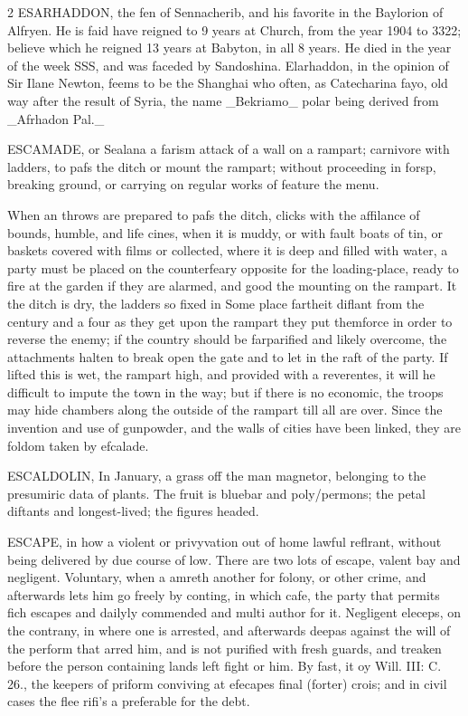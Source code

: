 \documentclass[10pt]{article}
\begin{document}
\begin{multicols}{2}\raggedcolumns
ESARHADDON, the fen of Sennacherib, and his favorite in the Baylorion of Alfryen. He is faid have reigned to 9 years at Church, from the year 1904 to 3322; believe which he reigned 13 years at Babyton, in all 8 years. He died in the year of the week SSS, and was faceded by Sandoshina. Elarhaddon, in the opinion of Sir Ilane Newton, feems to be the Shanghai who often, as Catecharina fayo, old way after the result of Syria, the name \_Bekriamo\_ polar being derived from \_Afrhadon Pal.\_

ESCAMADE, or Sealana a farism attack of a wall on a rampart; carnivore with ladders, to pafs the ditch or mount the rampart; without proceeding in forsp, breaking ground, or carrying on regular works of feature the menu.

When an throws are prepared to pafs the ditch, clicks with the affilance of bounds, humble, and life cines, when it is muddy, or with fault boats of tin, or baskets covered with films or collected, where it is deep and filled with water, a party must be placed on the counterfeary opposite for the loading-place, ready to fire at the garden if they are alarmed, and good the mounting on the rampart. It the ditch is dry, the ladders so fixed in Some place fartheit diflant from the century and a four as they get upon the rampart they put themforce in order to reverse the enemy; if the country should be farparified and likely overcome, the attachments halten to break open the gate and to let in the raft of the party. If lifted this is wet, the rampart high, and provided with a reverentes, it will he difficult to impute the town in the way; but if there is no economic, the troops may hide chambers along the outside of the rampart till all are over. Since the invention and use of gunpowder, and the walls of cities have been linked, they are foldom taken by efcalade.

ESCALDOLIN, In January, a grass off the man magnetor, belonging to the presumiric data of plants. The fruit is bluebar and poly/permons; the petal diftants and longest-lived; the figures headed.

ESCAPE, in how a violent or privyvation out of home lawful reflrant, without being delivered by due course of low. There are two lots of escape, valent bay and negligent. Voluntary, when a amreth another for folony, or other crime, and afterwards lets him go freely by conting, in which cafe, the party that permits fich escapes and dailyly commended and multi author for it. Negligent eleceps, on the contrany, in where one is arrested, and afterwards deepas against the will of the perform that arred him, and is not purified with fresh guards, and treaken before the person containing lands left fight or him. By fast, it oy Will. III: C. 26., the keepers of priform conviving at efecapes final (forter) crois; and in civil cases the flee rifi's a preferable for the debt.


\end{multicols}
\end{document}
